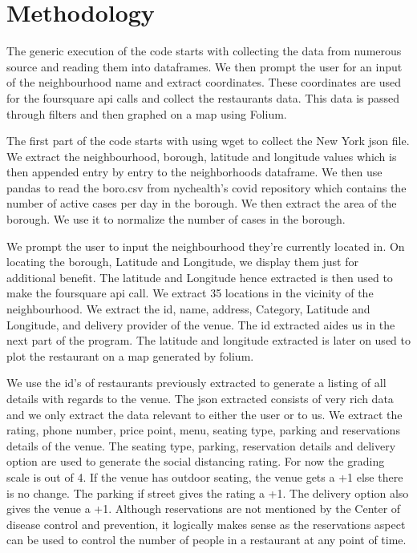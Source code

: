\documentclass[11pt]{report}
\begin{document}
\chapter{Methodology}
\par The generic execution of the code starts with collecting the data from numerous source and reading them into dataframes. We then prompt the user for an input of the neighbourhood name and extract coordinates. These coordinates are used for the foursquare api calls and collect the restaurants data. This data is passed through filters and then graphed on a map using Folium. 
\par The first part of the code starts with using wget to collect the New York json file. We extract the neighbourhood, borough, latitude and longitude values which is then appended entry by entry to the neighborhoods dataframe. We then use pandas to read the boro.csv from nychealth's covid repository which contains the number of active cases per day in the borough. We then extract the area of the borough. We use it to normalize the number of cases in the borough. 
\par We prompt the user to input the neighbourhood they're currently located in. On locating the borough, Latitude and Longitude, we display them just for additional benefit. The latitude and Longitude hence extracted is then used to make the foursquare api call. We extract 35 locations in the vicinity of the neighbourhood. We extract the id, name, address, Category, Latitude and Longitude, and delivery provider of the venue. The id extracted aides us in the next part of the program. The latitude and longitude extracted is later on used to plot the restaurant on a map generated by folium. 
\par We use the id's of restaurants previously extracted to generate a listing of all details with regards to the venue. The json extracted consists of very rich data and we only extract the data relevant to either the user or to us. We extract the rating, phone number, price point, menu, seating type, parking and reservations details of the venue. The seating type, parking, reservation details and delivery option are used to generate the social distancing rating. For now the grading scale is out of 4. If the venue has outdoor seating, the venue gets a +1 else there is no change. The parking if street gives the rating a +1. The delivery option also gives the venue a +1. \cite{restaurantconsiderations:article} Although reservations are not mentioned by the Center of disease control and prevention, it logically makes sense as the reservations aspect can be used to control the number of people in a restaurant at any point of time. 
\end{document}
